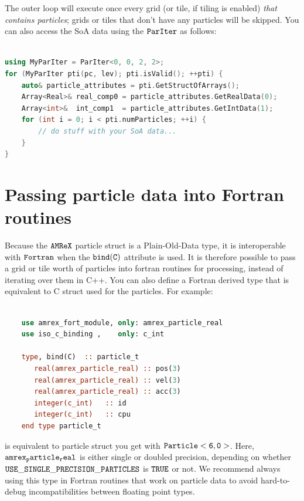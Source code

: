The outer loop will execute once every grid (or tile, if tiling is enabled) \emph{that contains particles}; grids or tiles
that don't have any particles will be skipped. You can also access the SoA data using the $\tt{ParIter}$ as follows:

\begin{lstlisting}[language=cpp]

using MyParIter = ParIter<0, 0, 2, 2>;
for (MyParIter pti(pc, lev); pti.isValid(); ++pti) {
    auto& particle_attributes = pti.GetStructOfArrays();
    Array<Real>& real_comp0 = particle_attributes.GetRealData(0);
    Array<int>&  int_comp1  = particle_attributes.GetIntData(1);
    for (int i = 0; i < pti.numParticles; ++i) {
        // do stuff with your SoA data...
    }
}
\end{lstlisting}

\section{Passing particle data into Fortran routines}
\label{sec:Particles:Fortran}

Because the $\tt{AMReX}$ particle struct is a Plain-Old-Data type, it is interoperable with $\tt{Fortran}$ when the $\tt{bind(C)}$
attribute is used. It is therefore possible to pass a grid or tile worth of particles into fortran routines for processing,
instead of iterating over them in C++. You can also define a Fortran derived type that is equivalent to C struct used for the
particles. For example:

\begin{lstlisting}[language=fortran]

    use amrex_fort_module, only: amrex_particle_real
    use iso_c_binding ,    only: c_int

    type, bind(C)  :: particle_t
       real(amrex_particle_real) :: pos(3)
       real(amrex_particle_real) :: vel(3)
       real(amrex_particle_real) :: acc(3)
       integer(c_int)   :: id
       integer(c_int)   :: cpu
    end type particle_t

\end{lstlisting}

is equivalent to particle struct you get with $\tt{Particle<6, 0>}$. Here, $\tt{amrex_particle_real}$ is either single or doubled precision, depending 
on whether $\tt{USE\_SINGLE\_PRECISION\_PARTICLES}$ is $\tt{TRUE}$ or not. We recommend always using this type in Fortran routines that work on particle
data to avoid hard-to-debug incompatibilities between floating point types.

